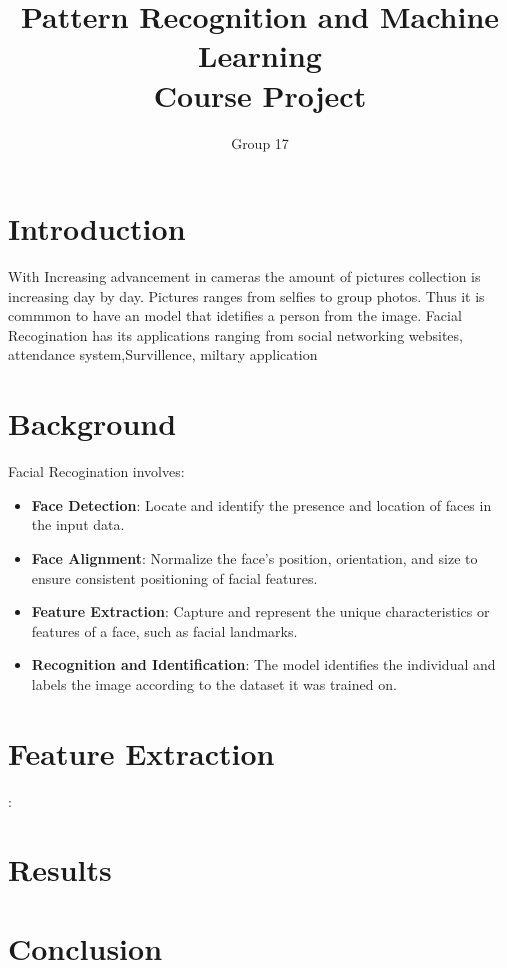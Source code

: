 \documentclass[12pt]{article}
\title{Pattern Recognition and Machine Learning \\ Course Project}
\author{Group 17}
\date{}
\begin{document}
\maketitle

\section*{Introduction}
With Increasing advancement in cameras the amount of pictures collection is increasing day by day. Pictures ranges from selfies to group photos. Thus it is commmon to have an model that idetifies a person from the image. Facial Recogination has its applications ranging from social networking websites, attendance system,Survillence, miltary application


\section{Background}
Facial Recogination involves:

\begin{itemize}
    \item \textbf{Face Detection}: Locate and identify the presence and location of faces in the input data.
    \item \textbf{Face Alignment}: Normalize the face's position, orientation, and size to ensure consistent positioning of facial features.
    \item \textbf{Feature Extraction}: Capture and represent the unique characteristics or features of a face, such as facial landmarks.
    \item \textbf{Recognition and Identification}: The model identifies the individual and labels the image according to the dataset it was trained on.
\end{itemize}




\section{Feature Extraction}:



\section{Results}


\section{Conclusion}

\end{document}
